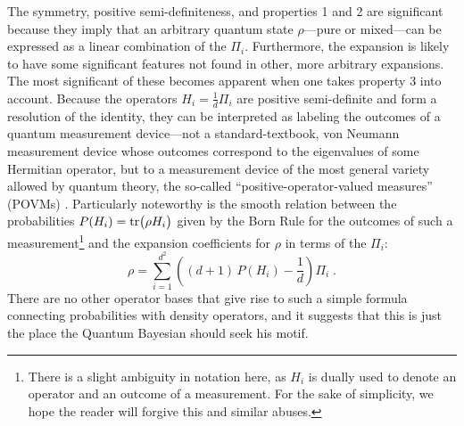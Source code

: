 The symmetry, positive semi-definiteness, and properties 1 and 2 are significant because they imply that an arbitrary quantum state $\rho$---pure or mixed---can be expressed as a linear combination of the $\Pi_i$.  Furthermore, the expansion is likely to have some significant features not found in other, more arbitrary expansions.  The most significant of these becomes apparent when one takes property 3 into account.  Because the operators $H_i=\frac1d \Pi_i$ are positive semi-definite and form a resolution of the identity, they can be interpreted as labeling the outcomes of a quantum measurement device---not a standard-textbook, von Neumann measurement device whose outcomes correspond to the eigenvalues of some Hermitian operator, but to a measurement device of the most general variety allowed by quantum theory, the so-called ``positive-operator-valued measures'' (POVMs) \cite{Nielsen00,Peres95}.  Particularly noteworthy is the smooth relation between the probabilities $P(H_i)={\rm tr}\big(\rho H_i\big)$ given by the Born Rule for the outcomes of such a measurement\footnote{There is a slight ambiguity in notation here, as $H_i$ is dually used to denote an operator and an outcome of a measurement. For the sake of simplicity, we hope the reader will forgive this and similar abuses.}
and the expansion coefficients for $\rho$ in terms of the $\Pi_i$:
\begin{equation}
\rho = \sum_{i=1}^{d^2}\left( (d+1)\,P(H_i) - \frac1d \right)\Pi_i\;.
\label{Ralph}
\end{equation}
There are no other operator bases that give rise to such a simple formula connecting probabilities with density operators, and it suggests that this is just the place the Quantum Bayesian should seek his motif.

